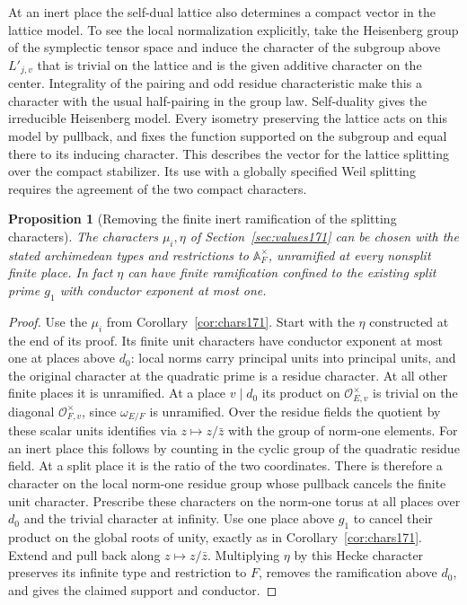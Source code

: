 \documentclass[a4paper,11pt]{article}
\newtheorem{proposition}{Proposition}[section]
\theoremstyle{definition}
\theoremstyle{remark}
\numberwithin{equation}{section}
\newcommand{\OO}{\mathcal O}
\begin{document}
At an inert place the self-dual lattice also determines a
compact vector in the lattice model. To see the local
normalization explicitly, take the Heisenberg group of the
symplectic tensor space and induce the character of the
subgroup above \(L'_{j,v}\) that is trivial on the lattice
and is the given additive character on the center.
Integrality of the pairing and odd residue characteristic make
this a character with the usual half-pairing in the group
law. Self-duality gives the irreducible Heisenberg model.
Every isometry preserving the lattice acts on this model by
pullback, and fixes the function supported on the subgroup and
equal there to its inducing character. This describes the
vector for the lattice splitting over the compact stabilizer.
Its use with a globally specified Weil splitting requires
the agreement of the two compact characters.

\begin{proposition}[Removing the finite inert ramification of the splitting characters]
\label{prop:splittings173}
The characters \(\mu_i,\eta\) of Section~\ref{sec:values171}
can be chosen with the stated archimedean types and restrictions
to \(\mathbb A_F^\times\), unramified at every nonsplit finite
place. In fact \(\eta\) can have finite ramification confined
to the existing split prime \(g_1\) with conductor exponent at
most one.
\end{proposition}
\begin{proof}
Use the \(\mu_i\) from Corollary~\ref{cor:chars171}.
Start with the \(\eta\) constructed at the end of its proof.
Its finite unit characters have conductor exponent at most one
at places above \(d_0\): local norms carry principal units
into principal units, and the original character at the
quadratic prime is a residue character. At all other finite
places it is unramified. At a place \(v\mid d_0\) its product
on \(\OO_{E,v}^{\times}\) is trivial on the diagonal
\(\OO_{F,v}^{\times}\), since \(\omega_{E/F}\) is unramified.
Over the residue fields the quotient by these scalar units
identifies via \(z\mapsto z/\bar z\) with the group of
norm-one elements. For an inert place this follows by
counting in the cyclic group of the quadratic residue
field. At a split place it is the ratio of the two coordinates.
There is therefore a character on the local norm-one residue
group whose pullback cancels the finite unit character.
Prescribe these characters on the norm-one torus at all
places over \(d_0\) and the trivial character at infinity.
Use one place above \(g_1\) to cancel their product on the
global roots of unity, exactly as in
Corollary~\ref{cor:chars171}. Extend and pull back along
\(z\mapsto z/\bar z\). Multiplying \(\eta\) by this Hecke
character preserves its infinite type and restriction to \(F\),
removes the ramification above \(d_0\), and gives the
claimed support and conductor.
\end{proof}
\end{document}
